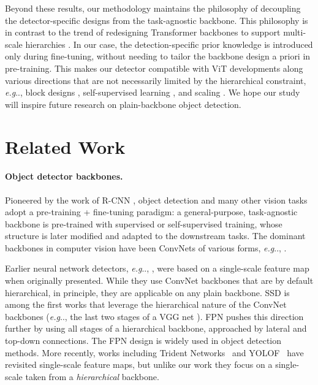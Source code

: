\documentclass[runningheads]{llncs}
\makeatletter
\DeclareRobustCommand\onedot{\futurelet\@let@token\@onedot}
\def\@onedot{\ifx\@let@token.\else.\null\fi\xspace}
\def\eg{\emph{e.g}\onedot} \def\Eg{\emph{E.g}\onedot}
\makeatother
\begin{document}
Beyond these results, our methodology maintains the philosophy of decoupling the detector-specific designs from the task-agnostic backbone. This philosophy is in contrast to the trend of redesigning Transformer backbones to support multi-scale hierarchies \cite{Liu2021,Wang2021,Fan2021,Heo2021}. In our case, the detection-specific prior knowledge is introduced only during fine-tuning, without needing to tailor the backbone design a priori in pre-training. This makes our detector compatible with ViT developments along various directions that are not necessarily limited by the hierarchical constraint, \eg, block designs \cite{Tolstikhin2021,Touvron2021c}, self-supervised learning \cite{Bao2021,He2021}, and scaling \cite{Zhai2021}. We hope our study will inspire future research on plain-backbone object detection.\footnotemark


\section{Related Work} \label{sec:related}

\paragraph{Object detector backbones.} Pioneered by the work of R-CNN \cite{Girshick2014}, object detection and many other vision tasks adopt a pre-training + fine-tuning paradigm: a general-purpose, task-agnostic backbone is pre-trained with supervised or self-supervised training, whose structure is later modified and adapted to the downstream tasks. The dominant backbones in computer vision have been ConvNets \cite{LeCun1989} of various forms, \eg, \cite{Krizhevsky2012,Simonyan2015,Szegedy2015,He2016}.

Earlier neural network detectors, \eg, \cite{He2014,Girshick2015,Ren2015,Redmon2016}, were based on a single-scale feature map when originally presented. While they use ConvNet backbones that are by default hierarchical, in principle, they are applicable on any plain backbone. SSD \cite{Liu2016} is among the first works that leverage the hierarchical nature of the ConvNet backbones (\eg, the last two stages of a VGG net \cite{Simonyan2015}). FPN \cite{Lin2017} pushes this direction further by using all stages of a hierarchical backbone, approached by lateral and top-down connections. The FPN design is widely used in object detection methods. More recently, works including Trident Networks~\cite{li2019scale} and YOLOF~\cite{chen2021you} have revisited single-scale feature maps, but unlike our work they focus on a single-scale taken from a \emph{hierarchical} backbone.
\end{document}
